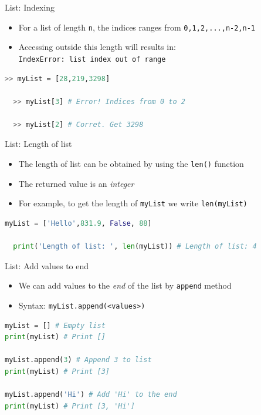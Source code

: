 \documentclass[10pt,xcolor={table,dvipsnames},t]{beamer}
\begin{document}
\begin{frame}[fragile]{List: Indexing}
  \begin{itemize}
    \item For a list of length \texttt{n}, the indices ranges from \texttt{0,1,2,...,n-2,n-1}
    \item Accessing outside this length will results in:\\
     \texttt{IndexError: list index out of range}
  \end{itemize}
\begin{lstlisting}[language=python]
  >> myList = [28,219,3298]

  >> myList[3] # Error! Indices from 0 to 2

  >> myList[2] # Corret. Get 3298 

\end{lstlisting}
\end{frame}

\begin{frame}[fragile]{List: Length of list}
  \begin{itemize}
    \item The length of list can be obtained by using the \texttt{len()} function
    \item The returned value is an \textit{integer}
    \item For example, to get the length of \texttt{myList} we write \texttt{len(myList)}
  \end{itemize}
\begin{lstlisting}[language=python]
  myList = ['Hello',831.9, False, 88]

  print('Length of list: ', len(myList)) # Length of list: 4
\end{lstlisting}
\end{frame}

\begin{frame}[fragile]{List: Add values to end}
  \begin{itemize}
    \item We can add values to the \textit{end} of the list by \texttt{append} method
    \item Syntax: \texttt{myList.append(<values>)}
  \end{itemize}
\begin{lstlisting}[language=python]
myList = [] # Empty list
print(myList) # Print []

myList.append(3) # Append 3 to list
print(myList) # Print [3]

myList.append('Hi') # Add 'Hi' to the end 
print(myList) # Print [3, 'Hi']
\end{lstlisting}
\end{frame}
\end{document}
